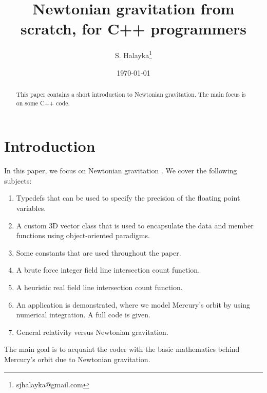 \documentclass[12pt]{article}
\title{Newtonian gravitation from scratch, for C++ programmers}
\author{S. Halayka\footnote{sjhalayka@gmail.com}}
\date{\today\;\currenttime}
\begin{document}
 
\maketitle

\begin{abstract}
This paper contains a short introduction to Newtonian gravitation.
The main focus is on some C++ code.
\end{abstract}




\section{Introduction}

In this paper, we focus on Newtonian gravitation \cite{misner}.
We cover the following subjects:
\begin{enumerate}
\item Typedefs that can be used to specify the precision of the floating point variables.
\item A custom 3D vector class that is used to encapsulate the data and member functions using object-oriented paradigms.
\item Some constants that are used throughout the paper.
\item A brute force integer field line intersection count function.
\item A heuristic real field line intersection count function.
\item An application is demonstrated, where we model Mercury's orbit by using numerical integration.
A full code is given.
\item General relativity versus Newtonian gravitation.
\end{enumerate}

The main goal is to acquaint the coder with the basic mathematics behind Mercury's orbit due to Newtonian gravitation.
\end{document}
